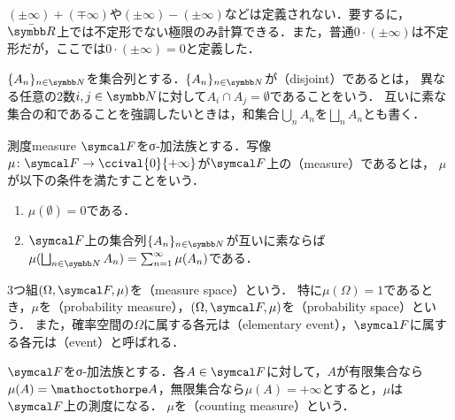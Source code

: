 \documentclass[../../main]{subfiles}
\begin{document}
\begin{note}
  \((\pm\infty)+(\mp\infty)\)や\((\pm\infty)-(\pm\infty)\)などは定義されない．要するに，\(\extendedreal\)上では不定形でない極限のみ計算できる．また，普通\(0\cdot(\pm\infty)\)は不定形だが，ここでは\(0\cdot(\pm\infty)=0\)と定義した．
\end{note}

\(\seq{A_n}_{n\in\numset{N}}\)を集合列とする．\(\seq{A_n}_{n\in\numset{N}}\)が（disjoint）であるとは，
異なる任意の2数\(i,j\in\numset{N}\)に対して\(A_i\cap A_j=\emptyset\)であることをいう．
互いに素な集合の和であることを強調したいときは，和集合\(\bigcup_nA_n\)を\(\bigsqcup_nA_n\)とも書く．

\begin{definition}{測度}{measure}
  \(\sigmaalg{F}\)をσ‐加法族とする．写像\(\mu\colon\sigmaalg{F}\to\ccival{0}{+\infty}\)が\(\sigmaalg{F}\)上の（measure）であるとは，
  \(\mu\)が以下の条件を満たすことをいう．
  \begin{enumerate}
    \item \(\mu(\emptyset)=0\)である．
    \item \(\sigmaalg{F}\)上の集合列\(\seq{A_n}_{n\in\numset{N}}\)が互いに素ならば\(\mu(\bigsqcup_{n\in\numset{N}}A_n)=\sum_{n=1}^\infty\mu(A_n)\)である．
  \end{enumerate}
\end{definition}

3つ組\((\Omega,\sigmaalg{F},\mu)\)を（measure space）という．
特に\(\mu(\Omega)=1\)であるとき，\(\mu\)を（probability measure），\((\Omega,\sigmaalg{F},\mu)\)を（probability space）という．
また，確率空間の\(\Omega\)に属する各元は（elementary event），\(\sigmaalg{F}\)に属する各元は（event）と呼ばれる．

\begin{example}[計数測度]
  \(\sigmaalg{F}\)をσ‐加法族とする．各\(A\in\sigmaalg{F}\)に対して，\(A\)が有限集合なら\(\mu(A)=\sizeof{A}\)，無限集合なら\(\mu(A)=+\infty\)とすると，\(\mu\)は\(\sigmaalg{F}\)上の測度になる．
  \(\mu\)を（counting measure）という．
\end{example}
\end{document}
